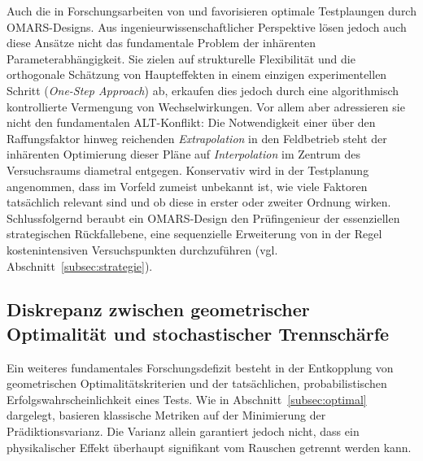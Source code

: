 Auch die in Forschungsarbeiten von \textcite{NunezAres.2020} und \textcite{Goos.2025} favorisieren optimale Testplaungen durch \ac{OMARS}-Designs.
Aus ingenieurwissenschaftlicher Perspektive lösen jedoch auch diese Ansätze nicht das fundamentale Problem der inhärenten Parameterabhängigkeit.
Sie zielen auf strukturelle Flexibilität und die orthogonale Schätzung von Haupteffekten in einem einzigen experimentellen Schritt (\textit{One-Step Approach}) ab, erkaufen dies jedoch durch eine algorithmisch kontrollierte Vermengung von Wechselwirkungen.
Vor allem aber adressieren sie nicht den fundamentalen \ac{ALT}-Konflikt: Die Notwendigkeit einer über den Raffungsfaktor hinweg reichenden \textit{Extrapolation} in den Feldbetrieb steht der inhärenten Optimierung dieser Pläne auf \textit{Interpolation} im Zentrum des Versuchsraums diametral entgegen.
Konservativ wird in der Testplanung angenommen, dass im Vorfeld zumeist unbekannt ist, wie viele Faktoren tatsächlich relevant sind und ob diese in erster oder zweiter Ordnung wirken.
Schlussfolgernd beraubt ein \ac{OMARS}-Design den Prüfingenieur der essenziellen strategischen Rückfallebene, eine sequenzielle Erweiterung von in der Regel kostenintensiven Versuchspunkten durchzuführen (vgl. Abschnitt~\ref{subsec:strategie}).

\subsection{Diskrepanz zwischen geometrischer Optimalität und stochastischer Trennschärfe} \label{subsec:limitierung_power}

Ein weiteres fundamentales Forschungsdefizit besteht in der Entkopplung von geometrischen Optimalitätskriterien und der tatsächlichen, probabilistischen Erfolgswahrscheinlichkeit eines Tests.
Wie in Abschnitt~\ref{subsec:optimal} dargelegt, basieren klassische Metriken auf der Minimierung der Prädiktionsvarianz.
Die Varianz allein garantiert jedoch nicht, dass ein physikalischer Effekt überhaupt signifikant vom Rauschen getrennt werden kann.


